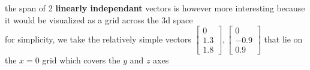 \documentclass[a4paper,12pt]{article}
\begin{document}
\begin{definition}
\begin{my_example}
\begin{center}

\end{center}

the span of 2 \textbf{linearly independant} vectors is however more interesting because it would be visualized as a grid across the 3d space\\
for simplicity, we take the relatively simple vectors \(\begin{bmatrix} 0\\1.3\\1.8 \end{bmatrix}, \begin{bmatrix} 0\\ -0.9\\ 0.9 \end{bmatrix}\) that lie on the \(x=0\) grid which covers the \(y\) and \(z\) axes\\
\begin{center}

\end{center}

\begin{center}

\end{center}
\end{my_example}
\end{definition}
\end{document}

